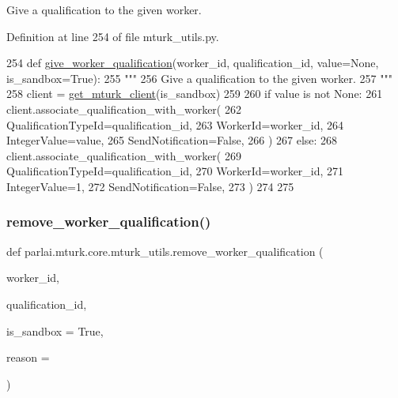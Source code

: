 \begin{DoxyVerb}Give a qualification to the given worker.
\end{DoxyVerb}
 

Definition at line 254 of file mturk\+\_\+utils.\+py.


\begin{DoxyCode}
254 \textcolor{keyword}{def }\hyperlink{namespaceparlai_1_1mturk_1_1core_1_1mturk__utils_a640e2d9d121507f92649cccbd27e3af9}{give\_worker\_qualification}(worker\_id, qualification\_id, value=None, 
      is\_sandbox=True):
255     \textcolor{stringliteral}{"""}
256 \textcolor{stringliteral}{    Give a qualification to the given worker.}
257 \textcolor{stringliteral}{    """}
258     client = \hyperlink{namespaceparlai_1_1mturk_1_1core_1_1mturk__utils_a577e2527c04682284394b0951a090695}{get\_mturk\_client}(is\_sandbox)
259 
260     \textcolor{keywordflow}{if} value \textcolor{keywordflow}{is} \textcolor{keywordflow}{not} \textcolor{keywordtype}{None}:
261         client.associate\_qualification\_with\_worker(
262             QualificationTypeId=qualification\_id,
263             WorkerId=worker\_id,
264             IntegerValue=value,
265             SendNotification=\textcolor{keyword}{False},
266         )
267     \textcolor{keywordflow}{else}:
268         client.associate\_qualification\_with\_worker(
269             QualificationTypeId=qualification\_id,
270             WorkerId=worker\_id,
271             IntegerValue=1,
272             SendNotification=\textcolor{keyword}{False},
273         )
274 
275 
\end{DoxyCode}
\mbox{\label{namespaceparlai_1_1mturk_1_1core_1_1mturk__utils_a9221bb896f04cca6c0acac4bc127fdbf}} 
\subsubsection{\texorpdfstring{remove\+\_\+worker\+\_\+qualification()}{remove\_worker\_qualification()}}
{\footnotesize\ttfamily def parlai.\+mturk.\+core.\+mturk\+\_\+utils.\+remove\+\_\+worker\+\_\+qualification (\begin{DoxyParamCaption}\item[{}]{worker\+\_\+id,  }\item[{}]{qualification\+\_\+id,  }\item[{}]{is\+\_\+sandbox = {\ttfamily True},  }\item[{}]{reason = {\ttfamily \textquotesingle{}\textquotesingle{}} }\end{DoxyParamCaption})}

